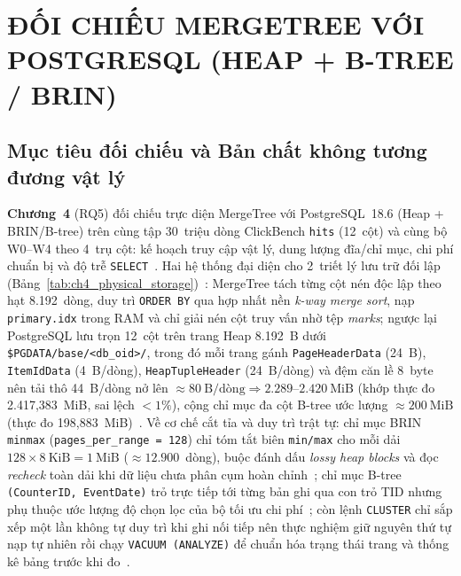 \documentclass[13pt,a4paper]{report}
\begin{document}
\chapter{ĐỐI CHIẾU MERGETREE VỚI POSTGRESQL (HEAP + B-TREE / BRIN)}

\section{Mục tiêu đối chiếu và Bản chất không tương đương vật lý}
\textbf{Chương~4} (RQ5) đối chiếu trực diện MergeTree với PostgreSQL~18.6 (Heap + BRIN/B-tree) trên cùng tập 30~triệu dòng ClickBench \texttt{hits} (12~cột) và cùng bộ W0--W4 theo 4~trụ cột: kế hoạch truy cập vật lý, dung lượng đĩa/chỉ mục, chi phí chuẩn bị và độ trễ \texttt{SELECT}~\cite{B4, B5}. Hai hệ thống đại diện cho 2~triết lý lưu trữ đối lập (Bảng~\ref{tab:ch4_physical_storage})~\cite{A1, S2, P1}: MergeTree tách từng cột nén độc lập theo hạt 8.192~dòng, duy trì \texttt{ORDER BY} qua hợp nhất nền \textit{k-way merge sort}, nạp \texttt{primary.idx} trong RAM và chỉ giải nén cột truy vấn nhờ tệp \textit{marks}; ngược lại PostgreSQL lưu trọn 12~cột trên trang Heap 8.192~B dưới \texttt{\$PGDATA/\allowbreak{}base/\allowbreak{}<db\_\allowbreak{}oid>/\allowbreak{}}, trong đó mỗi trang gánh \texttt{PageHeaderData} (24~B), \texttt{ItemIdData} (4~B/dòng), \texttt{HeapTupleHeader} (24~B/dòng) và đệm căn lề 8~byte nên tải thô 44~B/dòng nở lên $\approx 80~\text{B/dòng} \Rightarrow 2.289\text{--}2.420~\text{MiB}$ (khớp thực đo 2.417,383~MiB, sai lệch $< 1\%$), cộng chỉ mục đa cột B-tree ước lượng $\approx 200~\text{MiB}$ (thực đo 198,883~MiB)~\cite{P1, P3, P4}. Về cơ chế cắt tỉa và duy trì trật tự: chỉ mục BRIN \texttt{minmax} (\texttt{pages\_\allowbreak{}per\_\allowbreak{}range = 128}) chỉ tóm tắt biên \texttt{min/\allowbreak{}max} cho mỗi dải $128 \times 8~\text{KiB} = 1~\text{MiB}$ ($\approx 12.900$~dòng), buộc đánh dấu \textit{lossy heap blocks} và đọc \textit{recheck} toàn dải khi dữ liệu chưa phân cụm hoàn chỉnh~\cite{P2}; chỉ mục B-tree \mbox{\texttt{(CounterID, EventDate)}} trỏ trực tiếp tới từng bản ghi qua con trỏ TID nhưng phụ thuộc ước lượng độ chọn lọc của bộ tối ưu chi phí~\cite{P3, P4}; còn lệnh \texttt{CLUSTER} chỉ sắp xếp một lần không tự duy trì khi ghi nối tiếp nên thực nghiệm giữ nguyên thứ tự nạp tự nhiên rồi chạy \texttt{VACUUM (\allowbreak{}ANALYZE)} để chuẩn hóa trạng thái trang và thống kê bảng trước khi đo~\cite{P5, P6, P7}.
\end{document}
